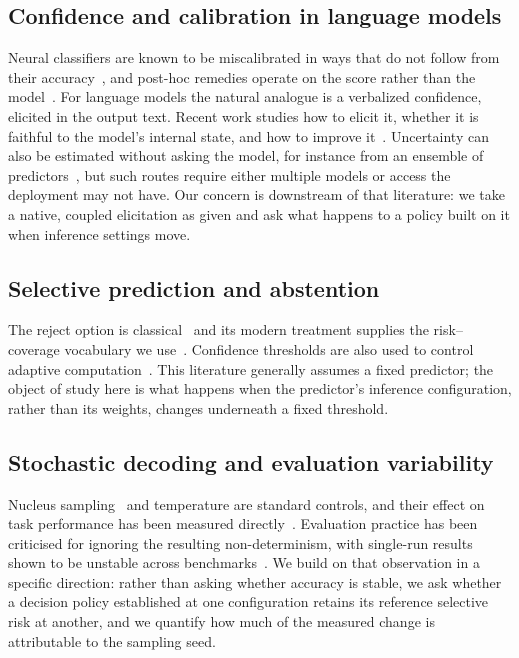 \documentclass[information,article,submit,moreauthors]{Definitions/mdpi}
\begin{document}
\subsection{Confidence and calibration in language models}

Neural classifiers are known to be miscalibrated in ways that do not follow from
their accuracy~\cite{guo2017calibration}, and post-hoc remedies operate on the
score rather than the model~\cite{zadrozny2002,niculescu2005}. For language
models the natural analogue is a verbalized confidence, elicited in the output
text. Recent work studies how to elicit it, whether it is faithful to the
model's internal state, and how to improve
it~\cite{tian2023calibration,ulmer2024calibrating,yona2024faithful,xu2024sayself}.
Uncertainty can also be estimated without asking the model, for instance from
an ensemble of predictors~\cite{lakshminarayanan2017ensembles}, but such routes
require either multiple models or access the deployment may not have. Our
concern is downstream of that literature: we take a native, coupled
elicitation as given and ask what happens to a policy built on it when inference
settings move.

\subsection{Selective prediction and abstention}

The reject option is classical~\cite{chow1970} and its modern treatment supplies
the risk--coverage vocabulary we use~\cite{elyaniv2010foundations,%
geifman2017selective}. Confidence thresholds are also used to control adaptive
computation~\cite{schuster2021consistent}. This literature generally assumes a
fixed predictor; the object of study here is what happens when the predictor's
inference configuration, rather than its weights, changes underneath a fixed
threshold.

\subsection{Stochastic decoding and evaluation variability}

Nucleus sampling~\cite{holtzman2020nucleus} and temperature are standard
controls, and their effect on task performance has been measured
directly~\cite{renze2024temperature}. Evaluation practice has been criticised
for ignoring the resulting non-determinism, with single-run results shown to be
unstable across benchmarks~\cite{song2025greedy}. We build on that observation in
a specific direction: rather than asking whether accuracy is stable, we ask
whether a decision policy established at one configuration retains its
reference selective risk at another, and we quantify how much of the measured
change is attributable to the sampling seed.
\end{document}
